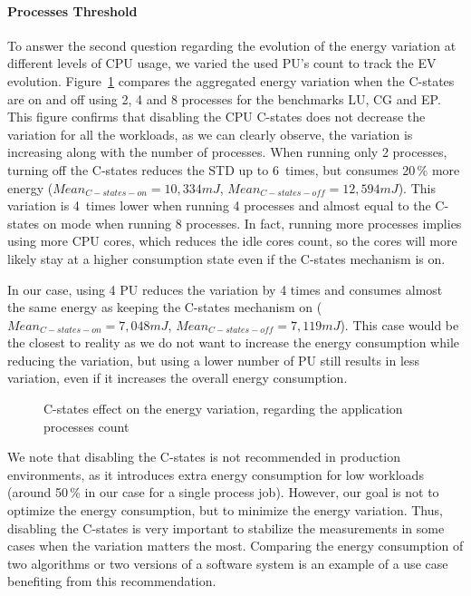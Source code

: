 \paragraph{Processes Threshold}
To answer the second question regarding the evolution of the energy variation at different levels of CPU usage, we varied the used PU's count to track the EV evolution.
Figure~\ref{fig:process-tresh} compares the aggregated energy variation when the C-states are on and off using 2, 4 and 8 processes for the benchmarks \textsf{LU}, \textsf{CG} and \textsf{EP}.
This figure confirms that disabling the CPU C-states does not decrease the variation for all the workloads, as we can clearly observe, the variation is increasing along with the number of processes.
When running only 2 processes, turning off the C-states reduces the STD up to 6~times, but consumes 20\,\% more energy ($Mean_{C-states-on}=10,334 mJ$, $Mean_{C-states-off}=12,594 mJ$).
This variation is 4~times lower when running 4 processes and almost equal to the \textsf{C-states on} mode when running 8 processes.
In fact, running more processes implies using more CPU cores, which reduces the idle cores count, so the cores will more likely stay at a higher consumption state even if the C-states mechanism is on.

In our case, using 4 PU reduces the variation by 4 times and consumes almost the same energy as keeping the C-states mechanism on ($Mean_{C-states-on}=7,048 mJ$, $Mean_{C-states-off}=7,119 mJ$).
This case would be the closest to reality as we do not want to increase the energy consumption while reducing the variation, but using a lower number of PU still results in less variation, even if it increases the overall energy consumption.

\begin{figure}
    \caption{C-states effect on the energy variation, regarding the application processes count}\label{fig:process-tresh}
\end{figure}

We note that disabling the C-states is not recommended in production environments, as it introduces extra energy consumption for low workloads (around 50\,\% in our case for a single process job).
However, our goal is not to optimize the energy consumption, but to minimize the energy variation.
Thus, disabling the C-states is very important to stabilize the measurements in some cases when the variation matters the most.
Comparing the energy consumption of two algorithms or two versions of a software system is an example of a use case benefiting from this recommendation.

